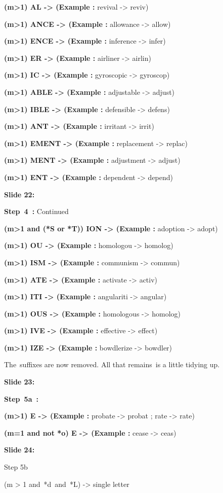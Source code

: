 \documentclass[11pt,a4paper]{article}
\begin{document}
\textbf{(m>1) AL -> (Example :}  revival -> reviv)

\textbf{(m>1) ANCE -> (Example :}  allowance -> allow)

\textbf{(m>1) ENCE -> (Example :}  inference -> infer)

\textbf{(m>1) ER -> (Example :}  airliner -> airlin)

\textbf{(m>1) IC -> (Example :}  gyroscopic -> gyroscop)

\textbf{(m>1) ABLE -> (Example :}  adjustable -> adjust)

\textbf{(m>1) IBLE -> (Example :}  defensible -> defens)

\textbf{(m>1) ANT -> (Example :}  irritant -> irrit)

\textbf{(m>1) EMENT -> (Example :}  replacement -> replac)

\textbf{(m>1) MENT -> (Example :}  adjustment -> adjust)

\textbf{(m>1) ENT -> (Example :}  dependent -> depend)

\textbf{Slide 22:}

\textbf{Step 4 :} Continued

\textbf{(m>1 and (*S or *T)) ION -> (Example :}  adoption -> adopt)​

\textbf{(m>1) OU -> (Example :}  homologou -> homolog)​

\textbf{(m>1) ISM -> (Example :}  communism -> commun)​

\textbf{(m>1) ATE -> (Example :}  activate -> activ)​

\textbf{(m>1) ITI -> (Example :}  angulariti -> angular)​

\textbf{(m>1) OUS -> (Example :}  homologous -> homolog)​

\textbf{(m>1) IVE -> (Example :}  effective -> effect)​

\textbf{(m>1) IZE -> (Example :}  bowdlerize -> bowdler)​

The suffixes are now removed. All that remains is a little tidying up.​​

\textbf{Slide 23:}

\textbf{Step 5a :} 

\textbf{(m>1) E -> (Example :}  probate -> probat ; rate -> rate)

\textbf{(m=1 and not *o) E -> (Example :}  cease -> ceas)

\textbf{Slide 24:}

Step 5b

(m > 1 and *d and *L) -> single letter
\end{document}
